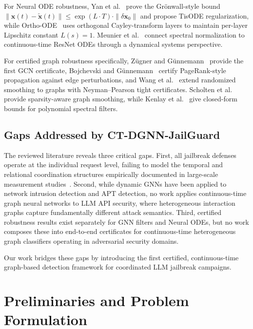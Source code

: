 \documentclass[journal]{IEEEtran}
\theoremstyle{plain}
\theoremstyle{definition}
\theoremstyle{remark}
\begin{document}
For Neural ODE robustness, Yan et al.~\cite{yan2020robustode} prove the Gr\"onwall-style bound $\|\mathbf{x}(t) - \tilde{\mathbf{x}}(t)\| \leq \exp(L \cdot T) \cdot \|\delta \mathbf{x}_0\|$ and propose TisODE regularization, while Ortho-ODE~\cite{ayinde2023orthoode} uses orthogonal Cayley-transform layers to maintain per-layer Lipschitz constant $L(s) = 1$. Meunier et al.~\cite{meunier2022lipschitzode} connect spectral normalization to continuous-time ResNet ODEs through a dynamical systems perspective.

For certified graph robustness specifically, Z\"ugner and G\"unnemann~\cite{zugner2019certifiable} provide the first GCN certificate, Bojchevski and G\"unnemann~\cite{bojchevski2019certifiable} certify PageRank-style propagation against edge perturbations, and Wang et al.~\cite{wang2021certifiedgraph} extend randomized smoothing to graphs with Neyman--Pearson tight certificates. Scholten et al.~\cite{scholten2022smoothing} provide sparsity-aware graph smoothing, while Kenlay et al.~\cite{kenlay2021lipschitz} give closed-form bounds for polynomial spectral filters.

\subsection{Gaps Addressed by CT-DGNN-JailGuard}

The reviewed literature reveals three critical gaps. First, all jailbreak defenses operate at the individual request level, failing to model the temporal and relational coordination structures empirically documented in large-scale measurement studies~\cite{shen2024dan}. Second, while dynamic GNNs have been applied to network intrusion detection and APT detection, no work applies continuous-time graph neural networks to LLM API security, where heterogeneous interaction graphs capture fundamentally different attack semantics. Third, certified robustness results exist separately for GNN filters and Neural ODEs, but no work composes these into end-to-end certificates for continuous-time heterogeneous graph classifiers operating in adversarial security domains.

Our work bridges these gaps by introducing the first certified, continuous-time graph-based detection framework for coordinated LLM jailbreak campaigns.

\section{Preliminaries and Problem Formulation}
\label{sec:preliminaries}
\end{document}
